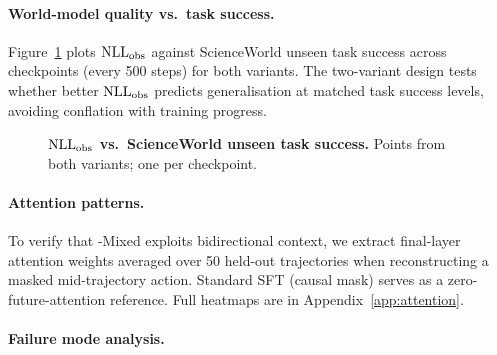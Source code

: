 \paragraph{World-model quality vs.\ task success.}
Figure~\ref{fig:nll_vs_success} plots $\mathrm{NLL}_{\mathrm{obs}}$ against ScienceWorld
unseen task success across checkpoints (every 500 steps) for both \aomt{}
variants. The two-variant design tests whether better $\mathrm{NLL}_{\mathrm{obs}}$
predicts generalisation at matched task success levels, avoiding conflation with
training progress.

\begin{figure}[h]
  \centering
  \caption{%
    \textbf{$\mathrm{NLL}_{\mathrm{obs}}$ vs.\ ScienceWorld unseen task success.}
    Points from both \aomt{} variants; one per checkpoint.
  }
  \label{fig:nll_vs_success}
\end{figure}

\paragraph{Attention patterns.}
To verify that \aomt{}-Mixed exploits bidirectional context, we extract
final-layer attention weights averaged over 50 held-out trajectories when
reconstructing a masked mid-trajectory action. Standard SFT (causal mask) serves
as a zero-future-attention reference. Full heatmaps are in Appendix~\ref{app:attention}.

\paragraph{Failure mode analysis.}
